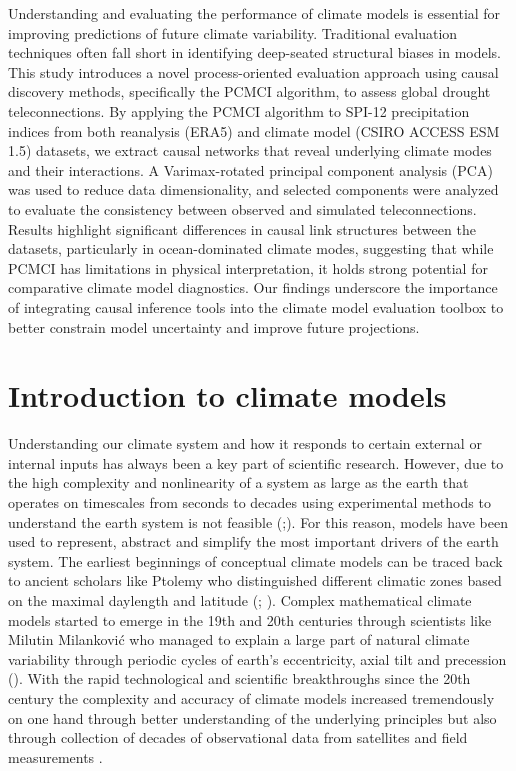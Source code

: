 \documentclass[
]{krantz}
\begin{document}
Understanding and evaluating the performance of climate models is essential for improving predictions of future climate variability. Traditional evaluation techniques often fall short in identifying deep-seated structural biases in models. This study introduces a novel process-oriented evaluation approach using causal discovery methods, specifically the PCMCI algorithm, to assess global drought teleconnections. By applying the PCMCI algorithm to SPI-12 precipitation indices from both reanalysis (ERA5) and climate model (CSIRO ACCESS ESM 1.5) datasets, we extract causal networks that reveal underlying climate modes and their interactions. A Varimax-rotated principal component analysis (PCA) was used to reduce data dimensionality, and selected components were analyzed to evaluate the consistency between observed and simulated teleconnections. Results highlight significant differences in causal link structures between the datasets, particularly in ocean-dominated climate modes, suggesting that while PCMCI has limitations in physical interpretation, it holds strong potential for comparative climate model diagnostics. Our findings underscore the importance of integrating causal inference tools into the climate model evaluation toolbox to better constrain model uncertainty and improve future projections.

\section{Introduction to climate models}\label{introduction-to-climate-models}

Understanding our climate system and how it responds to certain external or internal inputs has always been a key part of scientific research. However, due to the high complexity and nonlinearity of a system as large as the earth that operates on timescales from seconds to decades using experimental methods to understand the earth system is not feasible (\citet{edwards2011};\citet{runge2019}). For this reason, models have been used to represent, abstract and simplify the most important drivers of the earth system. The earliest beginnings of conceptual climate models can be traced back to ancient scholars like Ptolemy who distinguished different climatic zones based on the maximal daylength and latitude (\citet{edwards2011}; \citet{sanderson1999}). Complex mathematical climate models started to emerge in the 19th and 20th centuries through scientists like Milutin Milanković who managed to explain a large part of natural climate variability through periodic cycles of earth's eccentricity, axial tilt and precession (\citet{edwards2011}). With the rapid technological and scientific breakthroughs since the 20th century the complexity and accuracy of climate models increased tremendously on one hand through better understanding of the underlying principles but also through collection of decades of observational data from satellites and field measurements \citep{runge2019}.
\end{document}
